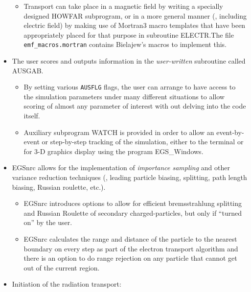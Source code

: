 \begin{itemize}
\begin{itemize}
  \item Transport can take place in a magnetic field by writing
  a specially designed HOWFAR subprogram, or in a more general
  manner (\eg, including electric field) by making use of
  Mortran3 macro templates that have been appropriately placed
  for that purpose in subroutine ELECTR.The file {\tt emf\_macros.mortran}
  contains Bielajew's macros to implement this.
  \end{itemize}

\item The user scores and outputs information in the
{\it user-written} subroutine called AUSGAB.

  \begin{itemize}

  \item By setting various {\tt AUSFLG} flags, the user can arrange to have
access to the simulation parameters under many different situations to
allow scoring of almost any parameter of interest with out delving into the
code itself.

  \item Auxiliary subprogram WATCH is provided in order to allow
  an event-by-event or step-by-step tracking of the simulation, either to
the terminal or for 3-D graphics display using the program EGS\_Windows.
 \end{itemize}

\item EGSnrc allows for the implementation of {\it importance
sampling} and other variance reduction techniques (\eg, leading
particle biasing, splitting, path length biasing, Russian
roulette, etc.).
  \begin{itemize}
  \item EGSnrc introduces options to allow for efficient bremsstrahlung
    splitting and Russian Roulette of secondary charged-particles, but only
    if ``turned on'' by the user.
  \item EGSnrc calculates the range and distance of the particle to the
   nearest boundary on every step as part of the electron transport algorithm
   and there is an option to do range rejection on any particle that cannot get out of
   the current region.

\end{itemize}

\item Initiation of the radiation transport:


\end{itemize}
